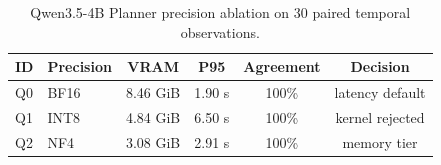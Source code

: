 \begin{table}
\caption{Qwen3.5-4B Planner precision ablation on 30 paired temporal observations.}
\label{tab:planner_quant}
\centering\small
\begin{tabular}{llcccc}
\toprule
ID & Precision & VRAM & P95 & Agreement & Decision \\
\midrule
Q0 & BF16 & 8.46 GiB & 1.90 s & 100\% & latency default \\
Q1 & INT8 & 4.84 GiB & 6.50 s & 100\% & kernel rejected \\
Q2 & NF4 & 3.08 GiB & 2.91 s & 100\% & memory tier \\
\bottomrule
\end{tabular}
\end{table}
